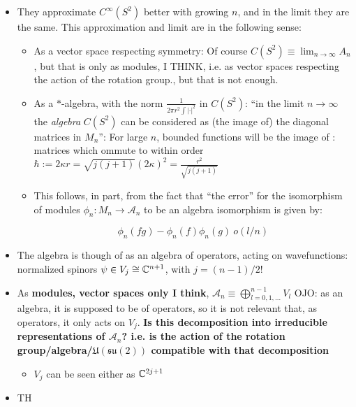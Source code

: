 \documentclass{article}
\begin{document}
\begin{itemize}
\begin{itemize}
        \end{itemize}
    
    \item They approximate $C^\infty(S^2)$ better with growing $n$, and in the limit they are the same. This approximation and limit are in the following sense:
    
        \begin{itemize}
        
        \item As a vector space respecting symmetry: Of course $C(S^2) \equiv \lim_{n \to \infty} A_n$, but that is only as modules, I THINK, i.e. as vector spaces respecting the action of the rotation group., but that is not enough.
        
        \item As a $*$-algebra, with the norm $\frac{1}{2\pi r^2 \int |\cdot|^2}$ in $C(S^2)$: ``in the limit $n \to \infty$ the \textit{algebra} $C(S^2)$ can be considered as (the image of) the diagonal matrices in $M_n$'': For large $n$, bounded functions will be the image of : matrices which ommute to within order $\hbar:= 2 \kappa r = \sqrt{j(j+1)}(2\kappa)^2 = \frac{r^2}{\sqrt{j(j+1)}}$
        
        \item This follows, in part, from the fact that ``the error'' for the isomorphism of modules $\phi_n : M_n \to \mathcal A_n$ to be an algebra isomorphism is given by:
        
        \[
            \phi_n(fg) - \phi_n(f)\phi_n(g) ~ o(l/n)
        \]
            
        \end{itemize}
    
    \item The algebra is though of as an algebra of operators, acting on wavefunctions: normalized spinors $\psi \in V_j \cong \mathbb{C}^{n+1}$, with $j = (n-1)/2$!
    
    \item As \textbf{modules, vector spaces only I think}, $\mathcal A_n \equiv \bigoplus_{l = 0, 1, \dots}^{n-1} V_l$ OJO: as an algebra, it is supposed to be of operators, so it is not relevant that, as operators, it only acts on $V_j$. \textbf{Is this decomposition into irreducible representations of $\mathcal A_n$? i.e. is the action of the rotation group/algebra/$\mathfrak{U(su(2))}$ compatible with that decomposition} 
    
        \begin{itemize}
            
        \item $V_j$ can be seen either as $\mathbb{C}^{2j+1}$
            
        \end{itemize}
    
    \item TH
    
    \end{itemize}
\end{document}
